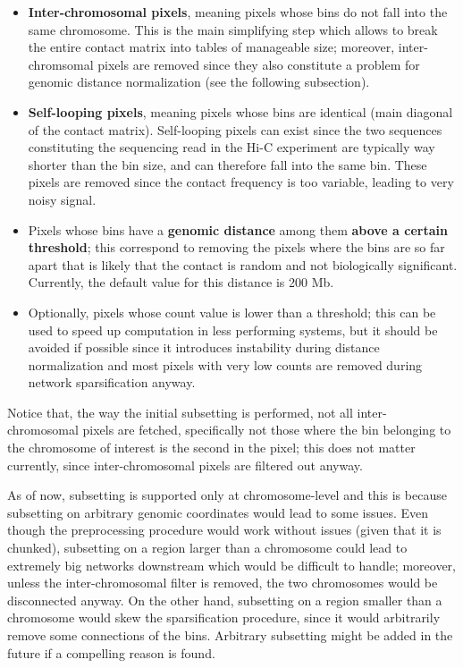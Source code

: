 \begin{itemize}\tightlist
  \item \textbf{Inter-chromosomal pixels}, meaning pixels whose bins do not fall into the same chromosome. This is the main simplifying step which allows to break the entire contact matrix into tables of manageable size; moreover, inter-chromsomal pixels are removed since they also constitute a problem for genomic distance normalization (see the following subsection).
  \item \textbf{Self-looping pixels}, meaning pixels whose bins are identical (main diagonal of the contact matrix). Self-looping pixels can exist since the two sequences constituting the sequencing read in the Hi-C experiment are typically way shorter than the bin size, and can therefore fall into the same bin. These pixels are removed since the contact frequency is too variable, leading to very noisy signal.
  \item Pixels whose bins have a \textbf{genomic distance} among them \textbf{above a certain threshold}; this correspond to removing the pixels where the bins are so far apart that is likely that the contact is random and not biologically significant. Currently, the default value for this distance is 200 Mb.
  \item Optionally, pixels whose count value is lower than a threshold; this can be used to speed up computation in less performing systems, but it should be avoided if possible since it introduces instability during distance normalization and most pixels with very low counts are removed during network sparsification anyway.
\end{itemize}

Notice that, the way the initial subsetting is performed, not all inter-chromosomal pixels are fetched, specifically not those where the bin belonging to the chromosome of interest is the second in the pixel; this does not matter currently, since inter-chromosomal pixels are filtered out anyway. 

As of now, subsetting is supported only at chromosome-level and this is because subsetting on arbitrary genomic coordinates would lead to some issues. Even though the preprocessing procedure would work without issues (given that it is chunked), subsetting on a region larger than a chromosome could lead to extremely big networks downstream which would be difficult to handle; moreover, unless the inter-chromosomal filter is removed, the two chromosomes would be disconnected anyway. On the other hand, subsetting on a region smaller than a chromosome would skew the sparsification procedure, since it would arbitrarily remove some connections of the bins. Arbitrary subsetting might be added in the future if a compelling reason is found.

